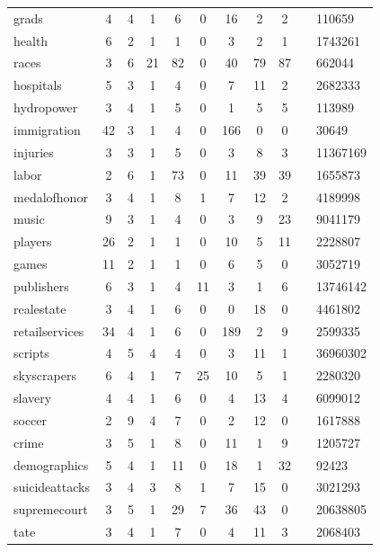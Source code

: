 \begin{figure*}
\begin{tabular}{ l | c c | c c c c c c |}
grads & 4 & 4 & 1 & 6 & 0 & 16 & 2 & 2 &  & 110659\\
health & 6 & 2 & 1 & 1 & 0 & 3 & 2 & 1 &  & 1743261\\
races & 3 & 6 & 21 & 82 & 0 & 40 & 79 & 87 &  & 662044\\
hospitals & 5 & 3 & 1 & 4 & 0 & 7 & 11 & 2 &  & 2682333\\
hydropower & 3 & 4 & 1 & 5 & 0 & 1 & 5 & 5 &  & 113989\\
immigration & 42 & 3 & 1 & 4 & 0 & 166 & 0 & 0 &  & 30649\\
injuries & 3 & 3 & 1 & 5 & 0 & 3 & 8 & 3 &  & 11367169\\
labor & 2 & 6 & 1 & 73 & 0 & 11 & 39 & 39 &  & 1655873\\
medalofhonor & 3 & 4 & 1 & 8 & 1 & 7 & 12 & 2 &  & 4189998\\
music & 9 & 3 & 1 & 4 & 0 & 3 & 9 & 23 &  & 9041179\\
players & 26 & 2 & 1 & 1 & 0 & 10 & 5 & 11 &  & 2228807\\
games & 11 & 2 & 1 & 1 & 0 & 6 & 5 & 0 &  & 3052719\\
publishers & 6 & 3 & 1 & 4 & 11 & 3 & 1 & 6 &  & 13746142\\
realestate & 3 & 4 & 1 & 6 & 0 & 0 & 18 & 0 &  & 4461802\\
retailservices & 34 & 4 & 1 & 6 & 0 & 189 & 2 & 9 &  & 2599335\\
scripts & 4 & 5 & 4 & 4 & 0 & 3 & 11 & 1 &  & 36960302\\
skyscrapers & 6 & 4 & 1 & 7 & 25 & 10 & 5 & 1 &  & 2280320\\
slavery & 4 & 4 & 1 & 6 & 0 & 4 & 13 & 4 &  & 6099012\\
soccer & 2 & 9 & 4 & 7 & 0 & 2 & 12 & 0 &  & 1617888\\
crime & 3 & 5 & 1 & 8 & 0 & 11 & 1 & 9 &  & 1205727\\
demographics & 5 & 4 & 1 & 11 & 0 & 18 & 1 & 32 &  & 92423\\
suicideattacks & 3 & 4 & 3 & 8 & 1 & 7 & 15 & 0 &  & 3021293\\
supremecourt & 3 & 5 & 1 & 29 & 7 & 36 & 43 & 0 &  & 20638805\\
tate & 3 & 4 & 1 & 7 & 0 & 4 & 11 & 3 &  & 2068403\\
\end{tabular}
\end{figure*}

